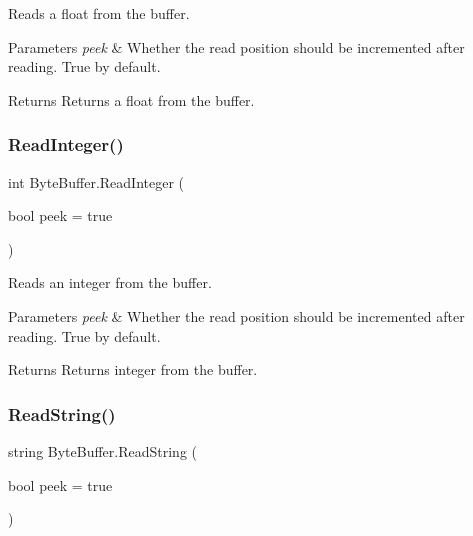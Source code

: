 Reads a float from the buffer. 


\begin{DoxyParams}{Parameters}
{\em peek} & Whether the read position should be incremented after reading. True by default.\\
\hline
\end{DoxyParams}
\begin{DoxyReturn}{Returns}
Returns a float from the buffer.
\end{DoxyReturn}
\mbox{\label{class_byte_buffer_a31b45da0084d7c7917292b151f01b69a}} 
\subsubsection{\texorpdfstring{ReadInteger()}{ReadInteger()}}
{\footnotesize\ttfamily int Byte\+Buffer.\+Read\+Integer (\begin{DoxyParamCaption}\item[{bool}]{peek = {\ttfamily true} }\end{DoxyParamCaption})}



Reads an integer from the buffer. 


\begin{DoxyParams}{Parameters}
{\em peek} & Whether the read position should be incremented after reading. True by default.\\
\hline
\end{DoxyParams}
\begin{DoxyReturn}{Returns}
Returns integer from the buffer.
\end{DoxyReturn}
\mbox{\label{class_byte_buffer_a2dc74466e4ca3e68bdcb7b4fdc8c0f3a}} 
\subsubsection{\texorpdfstring{ReadString()}{ReadString()}}
{\footnotesize\ttfamily string Byte\+Buffer.\+Read\+String (\begin{DoxyParamCaption}\item[{bool}]{peek = {\ttfamily true} }\end{DoxyParamCaption})}



